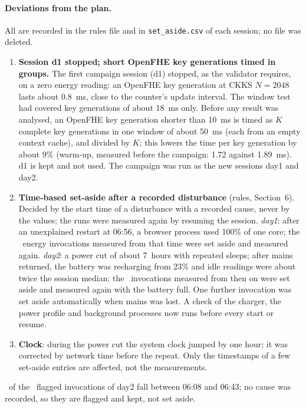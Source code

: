\documentclass[11pt]{article}
\begin{document}
\paragraph{Deviations from the plan.} All are recorded in the rules file and in \texttt{set\_aside.csv} of each session; no file was deleted.
\begin{enumerate}[leftmargin=*, itemsep=2pt]
  \item \textbf{Session d1 stopped; short OpenFHE key generations timed in groups.} The first campaign session (d1) stopped, as the validator requires, on a zero energy reading: an OpenFHE key generation at CKKS $N=2048$ lasts about 0.8~ms, close to the counter's update interval. The window test had covered key generations of about 18~ms only. Before any result was analysed, an OpenFHE key generation shorter than 10~ms is timed as $K$ complete key generations in one window of about 50~ms (each from an empty context cache), and divided by $K$; this lowers the time per key generation by about 9\% (warm-up, measured before the campaign: 1.72 against 1.89~ms). d1 is kept and not used. The campaign was run as the new sessions day1 and day2.
  \item \textbf{Time-based set-aside after a recorded disturbance} (rules, Section~6). Decided by the start time of a disturbance with a recorded cause, never by the values; the runs were measured again by resuming the session. \emph{day1}: after an unexplained restart at 06:56, a browser process used 100\% of one core; the \asideDistOne\ energy invocations measured from that time were set aside and measured again. \emph{day2}: a power cut of about 7~hours with repeated sleeps; after mains returned, the battery was recharging from 23\% and idle readings were about twice the session median: the \asideDistTwo\ invocations measured from then on were set aside and measured again with the battery full. One further invocation was set aside automatically when mains was lost. A check of the charger, the power profile and background processes now runs before every start or resume.
  \item \textbf{Clock}: during the power cut the system clock jumped by one hour; it was corrected by network time before the repeat. Only the timestamps of a few set-aside entries are affected, not the measurements.
\end{enumerate}
\noindent \flaggedMorningTwo\ of the \flaggedTwo\ flagged invocations of day2 fall between 06:08 and 06:43; no cause was recorded, so they are flagged and kept, not set aside.
\end{document}

